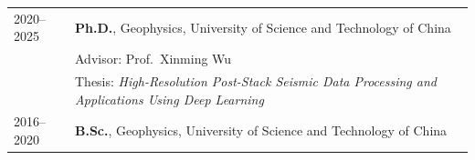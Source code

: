 

\renewcommand{\thefootnote}{\fnsymbol{footnote}}
\setcounter{footnote}{0}

    



\begin{longtable}{@{}p{}p{}@{}}

2020--2025 & \textbf{Ph.D.}, Geophysics, University of Science and Technology of China \\ 
           & Advisor: Prof.\ Xinming Wu \\
           & Thesis: \textit{High-Resolution Post-Stack Seismic Data Processing and Applications Using Deep Learning} \\[0.5em]

2016--2020 & \textbf{B.Sc.}, Geophysics, University of Science and Technology of China \\

\end{longtable}



\renewcommand{\thefootnote}{\arabic{footnote}}
\setcounter{footnote}{1}
